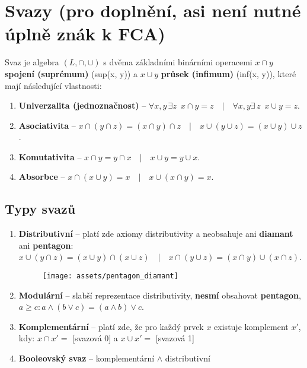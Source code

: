 \section{Svazy (pro doplnění, asi není nutné úplně znák k FCA)}
Svaz je algebra $(L, \cap, \cup)$ s dvěma základními binárními operacemi $x\cap{}y$ \textbf{spojení (suprémum)} (sup(x, y)) a $x\cup{}y$ \textbf{průsek (infimum)} (inf(x, y)), které mají následující vlastnosti:
\begin{enumerate}
    \item \textbf{Univerzalita (jednoznačnost)} -- $\forall x,y \,\exists z \,\,\, x \cap y = z\quad|\quad\forall x,y \exists\, z \,\,\, x \cup y = z$.
    \item \textbf{Asociativita} -- $x \cap (y \cap z) = (x \cap y) \cap z \quad|\quad x \cup (y \cup z) = (x \cup y) \cup z$.
    \item \textbf{Komutativita} -- $x \cap y = y \cap x \quad|\quad x \cup y = y \cup x$.
    \item \textbf{Absorbce} -- $x \cap (x \cup y) = x \quad|\quad x \cup (x \cap y) = x $.
\end{enumerate}

\subsection{Typy svazů}
\begin{enumerate}
    \item \textbf{Distributivní} -- platí zde axiomy distributivity a neobsahuje ani \textbf{diamant} ani \textbf{pentagon}: $x \cup (y \cap z) = (x \cup y) \cap (x \cup z) \quad|\quad x \cap (y \cup z) = (x \cap y) \cup (x \cap z) $.

          \begin{figure}[H]
              \centering
              \texttt{[image: assets/pentagon\_diamant]}
          \end{figure}
    \item \textbf{Modulární} -- slabší reprezentace distributivity, \textbf{nesmí} obsahovat \textbf{pentagon}, $a \geq c: a \land (b \lor c) = (a \land b) \lor c$.
    \item \textbf{Komplementární} -- platí zde, že pro každý prvek $ x $ existuje komplement $x' $, kdy: $x \cap x' = $ [svazová 0] a $x \cup x' = $ [svazová 1]
    \item \textbf{Booleovský svaz} -- komplementární $\land$ distributivní
\end{enumerate}

